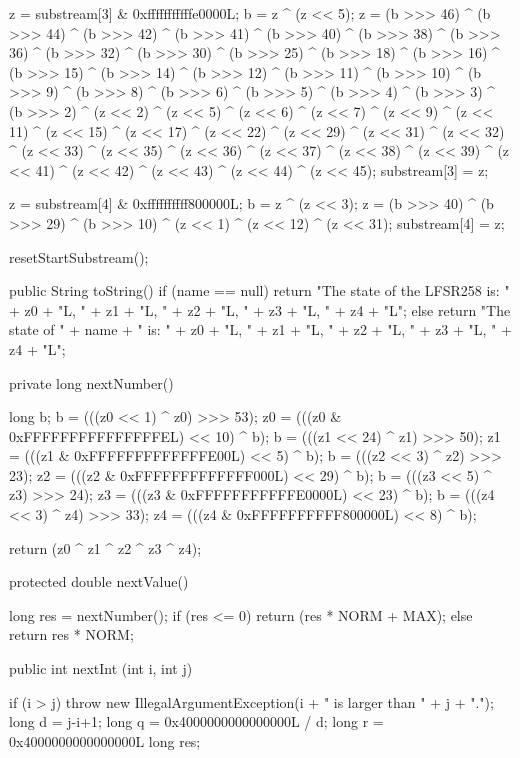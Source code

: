 \begin{code}
\begin{hide}
{        z = substream[3] & 0xfffffffffffe0000L;
        b = z ^ (z << 5);
        z = (b >>> 46) ^ (b >>> 44) ^ (b >>> 42) ^ (b >>> 41) ^ (b >>> 40) ^
            (b >>> 38) ^ (b >>> 36) ^ (b >>> 32) ^ (b >>> 30) ^ (b >>> 25) ^
            (b >>> 18) ^ (b >>> 16) ^ (b >>> 15) ^ (b >>> 14) ^ (b >>> 12) ^
            (b >>> 11) ^ (b >>> 10) ^ (b >>> 9) ^ (b >>> 8) ^ (b >>> 6) ^
            (b >>> 5) ^ (b >>> 4) ^ (b >>> 3) ^ (b >>> 2) ^ (z << 2) ^
            (z << 5) ^ (z << 6) ^ (z << 7) ^ (z << 9) ^ (z << 11) ^ (z << 15) ^
            (z << 17) ^ (z << 22) ^ (z << 29) ^ (z << 31) ^ (z << 32) ^
            (z << 33) ^ (z << 35) ^ (z << 36) ^ (z << 37) ^ (z << 38) ^
            (z << 39) ^ (z << 41) ^ (z << 42) ^ (z << 43) ^ (z << 44) ^
            (z << 45);
        substream[3] = z;


        z = substream[4] & 0xffffffffff800000L;
        b = z ^ (z << 3);
        z = (b >>> 40) ^ (b >>> 29) ^ (b >>> 10) ^ (z << 1) ^ (z << 12) ^
            (z << 31);
        substream[4] = z;

        resetStartSubstream();
    }


    public String toString() {
        if (name == null)
            return "The state of the LFSR258 is: " +
                   z0 + "L, " + z1 + "L, " + z2 + "L, " + z3 + "L, " + z4 + "L";
        else
            return "The state of " + name + " is: " +
                   z0 + "L, " + z1 + "L, " + z2 + "L, " + z3 + "L, " + z4 + "L";
    }


    private long nextNumber() {
       long b;
       b  = (((z0 <<  1) ^ z0) >>> 53);
       z0 = (((z0 & 0xFFFFFFFFFFFFFFFEL) << 10) ^ b);
       b  = (((z1 << 24) ^ z1) >>> 50);
       z1 = (((z1 & 0xFFFFFFFFFFFFFE00L) <<  5) ^ b);
       b  = (((z2 <<  3) ^ z2) >>> 23);
       z2 = (((z2 & 0xFFFFFFFFFFFFF000L) << 29) ^ b);
       b  = (((z3 <<  5) ^ z3) >>> 24);
       z3 = (((z3 & 0xFFFFFFFFFFFE0000L) << 23) ^ b);
       b  = (((z4 <<  3) ^ z4) >>> 33);
       z4 = (((z4 & 0xFFFFFFFFFF800000L) <<  8) ^ b);

       return (z0 ^ z1 ^ z2 ^ z3 ^ z4);
    }


    protected double nextValue() {

        long res = nextNumber();
        if (res <= 0)
            return (res * NORM + MAX);
        else
            return res * NORM;
    }


   public int nextInt (int i, int j) {
      if (i > j)
          throw new IllegalArgumentException(i + " is larger than " + j + ".");
      long d = j-i+1;
      long q = 0x4000000000000000L / d;
      long r = 0x4000000000000000L %
      long res;

}
\end{hide}
\end{code}
